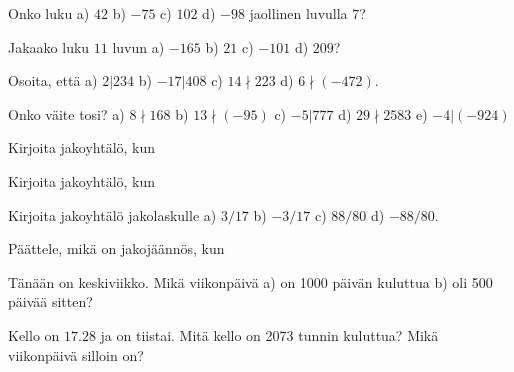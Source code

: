 \begin{kotitehtavasivu}

\begin{tehtava}
	Onko luku a) $42$ b) $-75$ c) $102$ d) $-98$ jaollinen luvulla $7$?
\end{tehtava}

\begin{tehtava}
	Jakaako luku $11$ luvun a) $-165$ b) $21$ c) $-101$ d) $209$?
\end{tehtava}

\begin{tehtava}
	Osoita, että a) $2|234$ b) $-17|408$ c) $14 \nmid 223$ d) $6 \nmid (-472)$.
\end{tehtava}

\begin{tehtava}
	Onko väite tosi? a) $8 \nmid 168$ b) $13 \nmid (-95)$ c) $-5|777$ d) $29\nmid 2583$ e) $-4|(-924)$
\end{tehtava}

\begin{tehtava}
	Kirjoita jakoyhtälö, kun
\end{tehtava}

\begin{tehtava}
	Kirjoita jakoyhtälö, kun
\end{tehtava}

\begin{tehtava}
	Kirjoita jakoyhtälö jakolaskulle a) $3/17$ b) $-3/17$ c) $88/80$ d) $-88/80$.
\end{tehtava}

\begin{tehtava}
	Päättele, mikä on jakojäännös, kun
\end{tehtava}

\begin{tehtava}
	Tänään on keskiviikko. Mikä viikonpäivä a) on 1000 päivän kuluttua b) oli 500 päivää sitten?
\end{tehtava}

\begin{tehtava}
	Kello on $17.28$ ja on tiistai. Mitä kello on 2073 tunnin kuluttua? Mikä viikonpäivä silloin on?
\end{tehtava}


\end{kotitehtavasivu}
